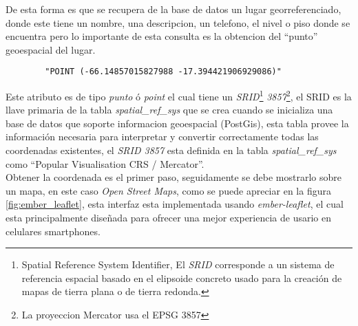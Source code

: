     De esta forma es que se recupera de la base de datos un lugar georreferenciado, donde este tiene un nombre, una descripcion, un telefono, el nivel o piso donde se encuentra pero lo importante de esta consulta es la obtencion del ``punto'' geoespacial del lugar.

    \begin{center}
      \begin{verbatim}
        "POINT (-66.14857015827988 -17.394421906929086)"
      \end{verbatim}
    \end{center}



     Este atributo es de tipo \emph{punto} \'o \emph{point} el cual tiene un \emph{SRID}\footnote{ Spatial Reference System Identifier, El \emph{SRID} corresponde a un sistema de referencia espacial basado en el elipsoide concreto usado para la creación de mapas de tierra plana o de tierra redonda.\cite{msdn_srid} } \emph{3857}\footnote{La proyeccion Mercator usa el EPSG 3857}, el SRID  es la llave primaria de la tabla \emph{spatial\_ref\_sys} que se crea cuando se inicializa una base de datos que soporte informacion geoespacial (PostGis), esta tabla provee la informaci\'on necesaria para interpretar y convertir correctamente todas las coordenadas existentes, el \emph{SRID 3857} esta definida en la tabla \emph{spatial\_ref\_sys} como ``Popular Visualisation CRS / Mercator''.\\


    Obtener la coordenada es el primer paso, seguidamente se debe mostrarlo sobre un mapa, en este caso \emph{Open Street Maps}, como se puede apreciar en la figura \ref{fig:ember_leaflet}, esta interfaz esta implementada usando \emph{ember-leaflet}, el cual esta principalmente dise\~nada para ofrecer una mejor experiencia de usario en celulares smartphones.\\


